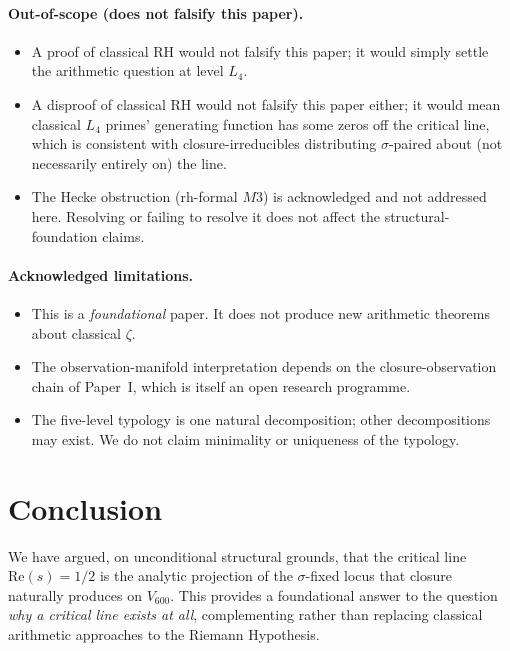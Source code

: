 \documentclass[11pt,a4paper]{article}
\theoremstyle{definition}
\theoremstyle{remark}
\begin{document}
\paragraph{Out-of-scope (does not falsify this paper).}
\begin{itemize}\itemsep0pt
  \item A proof of classical RH would not falsify this paper; it would simply settle the arithmetic question at level $L_4$.
  \item A disproof of classical RH would not falsify this paper either; it would mean classical $L_4$ primes' generating function has some zeros off the critical line, which is consistent with closure-irreducibles distributing $\sigma$-paired about (not necessarily entirely on) the line.
  \item The Hecke obstruction (rh-formal $M3$) is acknowledged and not addressed here. Resolving or failing to resolve it does not affect the structural-foundation claims.
\end{itemize}

\paragraph{Acknowledged limitations.}
\begin{itemize}\itemsep0pt
  \item This is a \emph{foundational} paper. It does not produce new arithmetic theorems about classical $\zeta$.
  \item The observation-manifold interpretation depends on the closure-observation chain of Paper~I, which is itself an open research programme.
  \item The five-level typology is one natural decomposition; other decompositions may exist. We do not claim minimality or uniqueness of the typology.
\end{itemize}

\section{Conclusion}\label{sec:conclusion}

We have argued, on unconditional structural grounds, that the critical
line $\mathrm{Re}(s) = 1/2$ is the analytic projection of the
$\sigma$-fixed locus that closure naturally produces on $V_{600}$. This
provides a foundational answer to the question \emph{why a critical line
exists at all}, complementing rather than replacing classical arithmetic
approaches to the Riemann Hypothesis.
\end{document}
